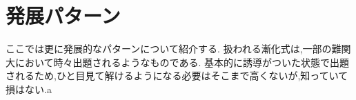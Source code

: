 
\section{発展パターン}
ここでは更に発展的なパターンについて紹介する.
扱われる漸化式は,一部の難関大において時々出題されるようなものである.
基本的に誘導がついた状態で出題されるため,ひと目見て解けるようになる必要はそこまで高くないが,知っていて損はない.a





